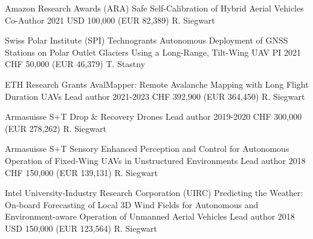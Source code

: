 \label{sec:funding}

\begin{cventries}

\begin{flushleft}
\end{flushleft}
	
\cvgrantentry
	{Amazon Research Awards (ARA)} %
	{Safe Self-Calibration of Hybrid Aerial Vehicles} %
	{Co-Author} %
	{2021} %
	{USD 100,000 (EUR 82,389)} %
	{R. Siegwart} %

\begin{flushleft}
\end{flushleft}

\cvgrantentry
	{Swiss Polar Institute (SPI) Technogrants} %
	{Autonomous Deployment of GNSS Stations on Polar Outlet Glaciers Using a Long-Range, Tilt-Wing UAV} %
	{PI} %
	{2021} %
	{CHF 50,000 (EUR 46,379)} %
	{T. Stastny} %

\cvgrantentry
	{ETH Research Grants} %
	{AvalMapper: Remote Avalanche Mapping with Long Flight Duration UAVs} %
	{Lead author} %
	{2021-2023} %
	{CHF 392,900 (EUR 364,450)} %
	{R. Siegwart} %
	
\cvgrantentry
	{Armasuisse S+T} %
	{Drop \& Recovery Drones} %
	{Lead author} %
	{2019-2020} %
	{CHF 300,000 (EUR 278,262)} %
	{R. Siegwart} %

\cvgrantentry
	{Armasuisse S+T} %
	{Sensory Enhanced Perception and Control for Autonomous Operation of Fixed-Wing UAVs in Unstructured Environments} %
	{Lead author} %
	{2018} %
	{CHF 150,000 (EUR 139,131)} %
	{R. Siegwart} %
	
\cvgrantentry
	{Intel University-Industry Research Corporation (UIRC)} %
	{Predicting the Weather: On-board Forecasting of Local 3D Wind Fields for Autonomous and Environment-aware Operation of Unmanned Aerial Vehicles} %
	{Lead author} %
	{2018} %
	{USD 150,000 (EUR 123,564)} %
	{R. Siegwart} %
	

\end{cventries}
